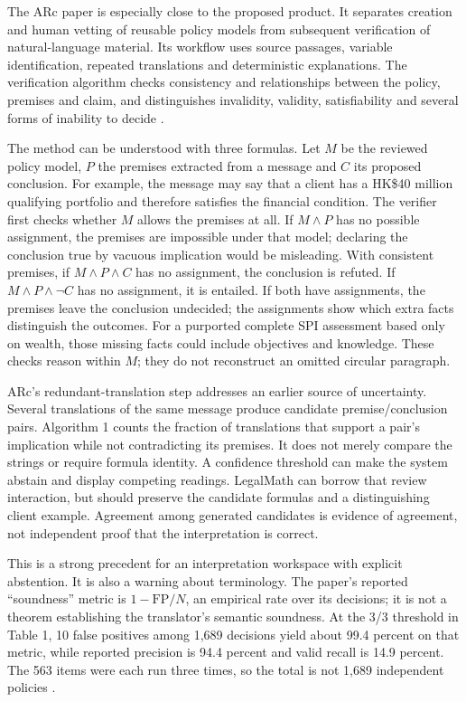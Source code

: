 The ARc paper is especially close to the proposed product. It separates creation
and human vetting of reusable policy models from subsequent verification of
natural-language material. Its workflow uses source passages, variable
identification, repeated translations and deterministic explanations. The
verification algorithm checks consistency and relationships between the policy,
premises and claim, and distinguishes invalidity, validity, satisfiability and
several forms of inability to decide
\citep[sec.~3 and Algorithm~1]{arc2025}.

The method can be understood with three formulas. Let $M$ be the reviewed policy
model, $P$ the premises extracted from a message and $C$ its proposed conclusion.
For example, the message may say that a client has a HK\$40 million qualifying
portfolio and therefore satisfies the financial condition. The verifier first
checks whether $M$ allows the premises at all. If $M\land P$ has no possible
assignment, the premises are impossible under that model; declaring the
conclusion true by vacuous implication would be misleading. With consistent
premises, if $M\land P\land C$ has no assignment, the conclusion is refuted.
If $M\land P\land\neg C$ has no assignment, it is entailed. If both have
assignments, the premises leave the conclusion undecided; the assignments show
which extra facts distinguish the outcomes. For a purported complete SPI
assessment based only on wealth, those missing facts could include objectives
and knowledge. These checks reason within $M$; they do not reconstruct an
omitted circular paragraph.

ARc's redundant-translation step addresses an earlier source of uncertainty.
Several translations of the same message produce candidate premise/conclusion
pairs. Algorithm 1 counts the fraction of translations that support a pair's
implication while not contradicting its premises. It does not merely compare
the strings or require formula identity. A confidence threshold can make the
system abstain and display competing readings. LegalMath can borrow that
review interaction, but should preserve the candidate formulas and a
distinguishing client example. Agreement among generated candidates is evidence
of agreement, not independent proof that the interpretation is correct.

This is a strong precedent for an interpretation workspace with explicit
abstention. It is also a warning about terminology. The paper's reported
``soundness'' metric is $1-\mathrm{FP}/N$, an empirical rate over its decisions;
it is not a theorem establishing the translator's semantic soundness. At the
3/3 threshold in Table 1, 10 false positives among 1,689 decisions yield about
99.4 percent on that metric, while reported precision is 94.4 percent and valid
recall is 14.9 percent. The 563 items were each run three times, so the total is
not 1,689 independent policies \citep[sec.~4, Table~1]{arc2025}.

